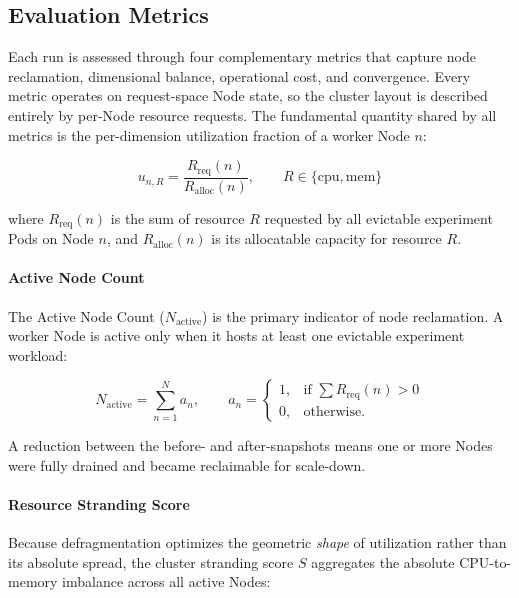 \subsection{Evaluation Metrics}
\label{sec:defrag_metrics}

Each run is assessed through four complementary metrics that capture node reclamation, dimensional balance, operational cost, and convergence. Every metric operates on request-space Node state, so the cluster layout is described entirely by per-Node resource requests. The fundamental quantity shared by all metrics is the per-dimension utilization fraction of a worker Node \(n\):

\[
u_{n,R}
=
\frac{R_{\text{req}}(n)}
{R_{\text{alloc}}(n)},
\qquad
R \in \{\text{cpu}, \text{mem}\}
\]

where \(R_{\text{req}}(n)\) is the sum of resource \(R\) requested by all evictable experiment Pods on Node \(n\), and \(R_{\text{alloc}}(n)\) is its allocatable capacity for resource \(R\).

\paragraph{Active Node Count}
The Active Node Count (\(N_{\text{active}}\)) is the primary indicator of node reclamation. A worker Node is active only when it hosts at least one evictable experiment workload:

\[
N_{\text{active}} = \sum_{n=1}^{N} a_n,
\qquad
a_n =
\begin{cases}
1, & \text{if } \sum R_{\text{req}}(n) > 0 \\
0, & \text{otherwise.}
\end{cases}
\]

A reduction between the before- and after-snapshots means one or more Nodes were fully drained and became reclaimable for scale-down.

\paragraph{Resource Stranding Score}
Because defragmentation optimizes the geometric \emph{shape} of utilization rather than its absolute spread, the cluster stranding score \(S\) aggregates the absolute CPU-to-memory imbalance across all active Nodes:

